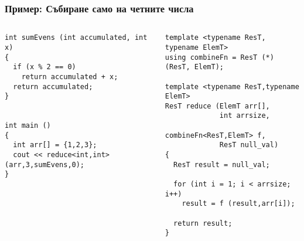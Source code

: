 \documentclass{beamer}
\begin{document}
\begin{frame}[fragile]
\frametitle{Пример: Събиране само на четните числа}


\begin{columns}[t]
  \begin{column}{0.55\textwidth}

\begin{flushleft}
\begin{lstlisting}
int sumEvens (int accumulated, int x)
{
  if (x % 2 == 0)
    return accumulated + x;
  return accumulated;
}


int main ()
{
  int arr[] = {1,2,3};
  cout << reduce<int,int> (arr,3,sumEvens,0);
}

\end{lstlisting}  
\end{flushleft}
  \end{column}
  \begin{column}{0.45\textwidth}
\begin{flushleft}
\vspace{-30px}
\begin{lstlisting}
template <typename ResT, typename ElemT>
using combineFn = ResT (*) (ResT, ElemT);

template <typename ResT,typename ElemT>
ResT reduce (ElemT arr[], 
             int arrsize, 
             combineFn<ResT,ElemT> f, 
             ResT null_val)
{
  ResT result = null_val;

  for (int i = 1; i < arrsize; i++)
    result = f (result,arr[i]);

  return result;
}
\end{lstlisting}  
\end{flushleft}

  \end{column}
\end{columns}

\end{frame}
\end{document}
